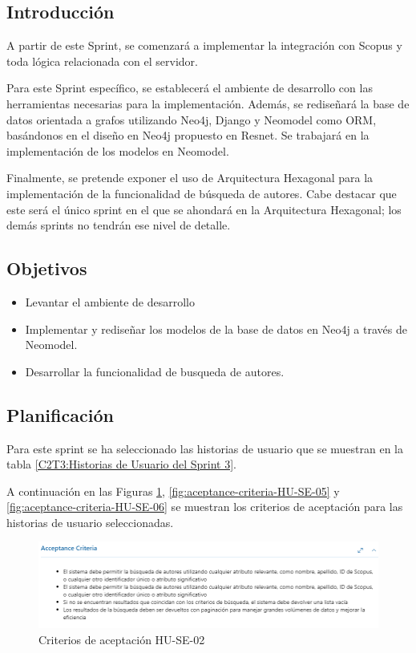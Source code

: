 \subsection{Introducción}
\label{section:introduction-sprint-3}
A partir de este Sprint, se comenzará a implementar la integración con Scopus y toda lógica relacionada con el servidor. 

Para este Sprint específico, se establecerá el ambiente de desarrollo con las herramientas necesarias para la implementación.
Además, se rediseñará la base de datos orientada a grafos utilizando Neo4j, Django y Neomodel como ORM, basándonos en el diseño en Neo4j propuesto en Resnet.
Se trabajará en la implementación de los modelos en Neomodel.

Finalmente, se pretende exponer el uso de Arquitectura Hexagonal para la implementación de la funcionalidad de búsqueda de autores. Cabe destacar que este será el único sprint en el que se ahondará en la Arquitectura Hexagonal;
los demás sprints no tendrán ese nivel de detalle.

\subsection{Objetivos}

\begin{itemize}
    \item Levantar el ambiente de desarrollo
    \item Implementar y rediseñar los modelos de la base de datos en Neo4j a través de Neomodel.
    \item Desarrollar la funcionalidad de busqueda de autores.
\end{itemize}

\subsection{Planificación}

Para este sprint se ha seleccionado las historias de usuario que se muestran en la tabla \ref{C2T3:Historias de Usuario del Sprint 3}.



A continuación en las Figuras \ref{fig:aceptance-criteria-HU-SE-02}, \ref{fig:aceptance-criteria-HU-SE-05} y \ref{fig:aceptance-criteria-HU-SE-06}
se muestran los criterios de aceptación para las historias de usuario seleccionadas.
\begin{figure}[H]
    \centering
    \includegraphics[scale=0.7]{../02Figures/02Chapter/Sprints/Sprint-3/aceptance-criteria-HU-SE-02.png}
    \caption{Criterios de aceptación HU-SE-02}
    \label{fig:aceptance-criteria-HU-SE-02}
\end{figure}

